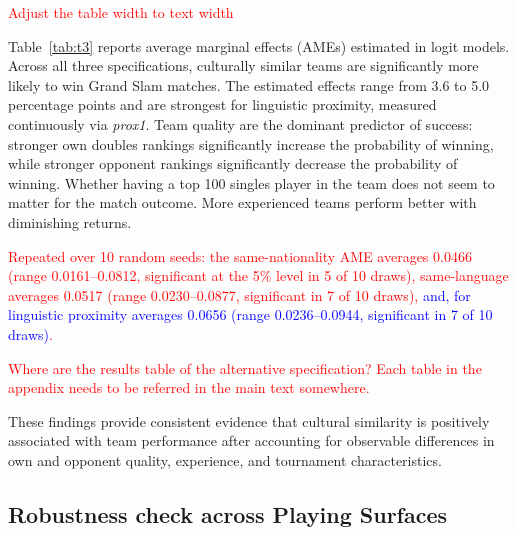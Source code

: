 \documentclass[10pt]{article}
\begin{document}
\begin{table}[htbp]
\begin{threeparttable}
\begin{tablenotes}
\end{tablenotes}
\end{threeparttable}
\end{table}
\FloatBarrier

\textcolor{red}{Adjust the table width to text width}

Table~\ref{tab:t3} reports average marginal effects (AMEs) estimated in logit models. %
Across all three specifications, culturally similar teams are significantly more likely to win Grand Slam matches. The estimated effects range from 3.6 to 5.0 percentage points and are strongest for linguistic proximity, measured continuously via \textit{prox1}. Team quality are the dominant predictor of success: stronger own doubles rankings significantly increase the probability of winning, while stronger opponent rankings significantly decrease the probability of winning. Whether having a top 100 singles player in the team does not seem to matter for the match outcome. More experienced teams perform better with diminishing returns.

 \textcolor{red}{Repeated over 10 random seeds: the same-nationality AME averages 0.0466 (range 0.0161--0.0812, significant at the 5\% level in 5 of 10 draws), same-language averages 0.0517 (range 0.0230--0.0877, significant in 7 of 10 draws), \textcolor{blue}{and, for linguistic proximity averages 0.0656 (range 0.0236--0.0944, significant in 7 of 10 draws)}.}

\textcolor{red}{Where are the results table of the alternative specification? Each table in the appendix needs to be referred in the main text somewhere.}

These findings provide consistent evidence that cultural similarity is positively associated with team performance after accounting for observable differences in own and opponent quality,  experience, and tournament characteristics.


\subsection{Robustness check across Playing Surfaces} 
\end{document}
